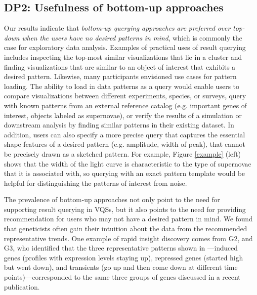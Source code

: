 
\subsection{DP2: Usefulness of bottom-up approaches}
\par Our results indicate that \emph{bottom-up querying approaches are preferred over top-down when the users have no desired patterns in mind}, which is commonly the case for exploratory data analysis. Examples of practical uses of result querying includes inspecting the top-most similar visualizations that lie in a cluster and finding visualizations that are similar to an object of interest that exhibits a desired pattern. Likewise, many participants envisioned use cases for pattern loading. The ability to load in data patterns as a query would enable users to compare visualizations between different experiments, species, or surveys, query with known patterns from an external reference catalog (e.g. important genes of interest, objects labeled as supernovae), or verify the results of a simulation or downstream analysis by finding similar patterns in their existing dataset. In addition, users can also specify a more precise query that captures the essential shape features of a desired pattern (e.g. amplitude, width of peak), that  cannot be precisely drawn as a sketched pattern. For example, Figure \ref{example} (left) shows that the width of the light curve is characteristic to the type of supernovae that it is associated with, so querying with an exact pattern template would be helpful for distinguishing the patterns of interest from noise.
\par The prevalence of bottom-up approaches not only point to the need for supporting result querying in VQSs, but it also points to the need for providing recommendation for users who may not have a desired pattern in mind. We found that geneticists often gain their intuition about the data from the recommended representative trends. One example of rapid insight discovery comes from G2, and G3, who identified that the three representative patterns shown in \zv---induced genes (profiles with expression levels staying up), repressed genes (started high but went down), and transients (go up and then come down at different time points)---corresponded to the same three groups of genes discussed in a recent publication\cite{Gloss2017}.
